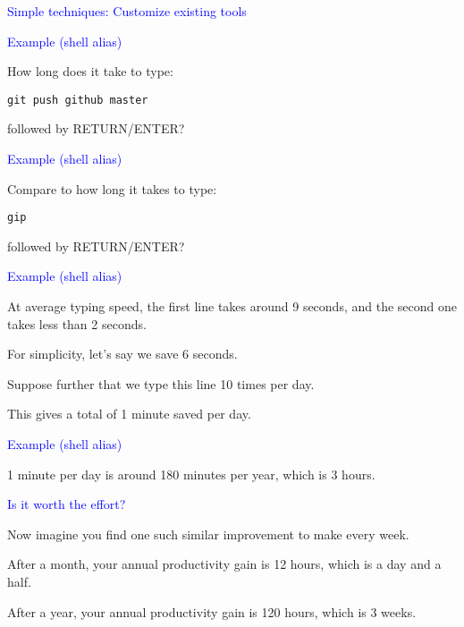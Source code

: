 \documentclass{slides}
\newcommand{\ti}[1]{\begin{center}\Large{\textcolor{blue}{#1}}\end{center}}
\begin{document}
\begin{slide}\ti{Simple techniques: Customize existing tools}

\vfill\end{slide}
\begin{slide}\ti{Example (shell alias)}

How long does it take to type:

\texttt{git push github master}

followed by RETURN/ENTER?

\vfill\end{slide}
\begin{slide}\ti{Example (shell alias)}

Compare to how long it takes to type:

\texttt{gip}

followed by RETURN/ENTER?

\vfill\end{slide}
\begin{slide}\ti{Example (shell alias)}

At average typing speed, the first line takes around 9 seconds, and
the second one takes less than 2 seconds.

For simplicity, let's say we save 6 seconds.

Suppose further that we type this line 10 times per day.

This gives a total of 1 minute saved per day.

\vfill\end{slide}
\begin{slide}\ti{Example (shell alias)}

1 minute per day is around 180 minutes per year, which is 3 hours.

\vfill\end{slide}
\begin{slide}\ti{Is it worth the effort?}

Now imagine you find one such similar improvement to make every week.

After a month, your annual productivity gain is 12 hours, which is a
day and a half.

After a year, your annual productivity gain is 120 hours, which is 3
weeks.

\vfill\end{slide}
\end{document}

